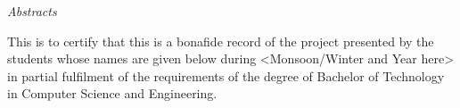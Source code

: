 \newpage
\thispagestyle{empty}

\begin{center}
\emph{\LARGE Abstracts}\\[2.5cm]
\end{center}

\normalsize This is to certify that this is a bonafide record of the project presented by the students whose names are given below during <Monsoon/Winter and Year here> in partial fulfilment of the requirements of the degree of Bachelor of Technology in Computer Science and Engineering.\\[1.0cm]







